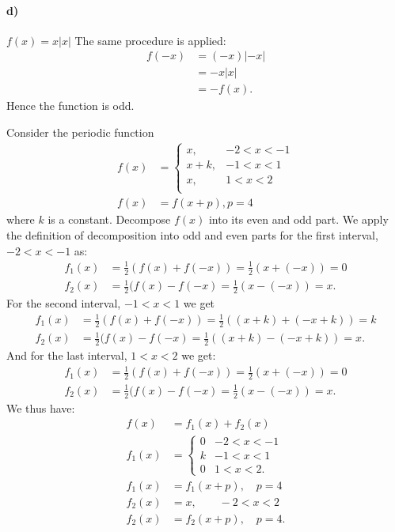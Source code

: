 \paragraph{d)} $f(x) = x |x|$
\bigbreak
The same procedure is applied:
\begin{align*}
  f(-x) &= (-x) \left| -x \right| \\
        &= -x \left| x \right| \\
        &= -f(x)
.\end{align*}
Hence the function is odd.


 Consider the periodic function
\begin{align*}
  f(x) &= \begin{cases}
    x, & -2 < x < -1 \\
    x + k, & -1 < x < 1 \\
    x, & 1 < x < 2\\
  \end{cases} \\
    f(x) &= f(x+p), p = 4
\end{align*}
where $k$ is a constant. Decompose $f(x)$ into its even and odd part.
\bigbreak
We apply the definition of decomposition into odd and even parts for the first interval, $-2<x< -1$ as:
\begin{align*}
  f_1(x) &= \frac{1}{2} (f(x) + f(-x)) = \frac{1}{2}(x + (-x)) = 0 \\
  f_2 (x) &= \frac{1}{2} (f(x) - f(-x) = \frac{1}{2} (x - (-x)) = x
.\end{align*}
For the second interval, $-1 < x < 1$ we get
\begin{align*}
  f_1(x) &= \frac{1}{2} (f(x) + f(-x)) = \frac{1}{2}((x+k) + (-x + k)) = k \\
  f_2 (x) &= \frac{1}{2} (f(x) - f(-x) = \frac{1}{2} ((x+k) - (-x + k)) = x
.\end{align*}
And for the last interval, $1 < x < 2$ we get:
\begin{align*}
  f_1(x) &= \frac{1}{2} (f(x) + f(-x)) = \frac{1}{2}(x + (-x)) = 0 \\
  f_2 (x) &= \frac{1}{2} (f(x) - f(-x) = \frac{1}{2} (x - (-x)) = x
.\end{align*}
We thus have:
\begin{align*}
  f(x) &= f_1(x) + f_2(x) \\
  f_1(x) &= \begin{cases}
  0 & -2 < x < -1\\
  k & -1 < x < 1 \\
  0 & 1<x<2
  .\end{cases} \\
  f_1(x) &= f_1(x+p), \quad p = 4 \\
  f_2(x) &= x, \qquad -2 < x < 2 \\
  f_2(x) &= f_2(x+p), \quad p = 4
.\end{align*}

